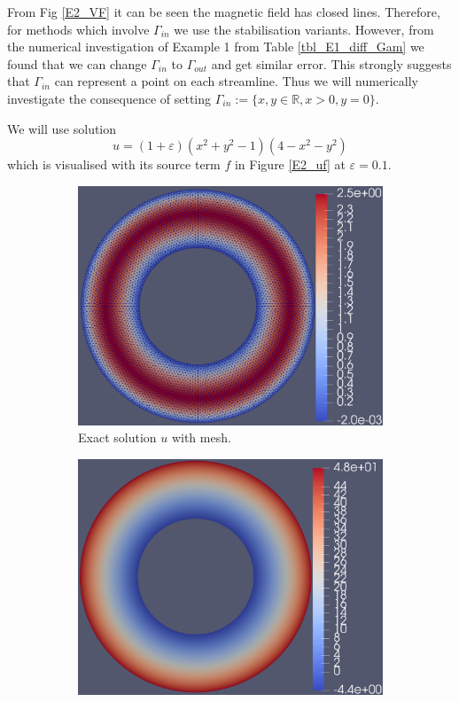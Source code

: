\documentclass[12pt]{ociamthesis}
\begin{document}
From Fig \ref{E2_VF} it can be seen the magnetic field has closed lines. Therefore, for methods which involve $\Gamma_{in}$ we use the stabilisation variants. However, from the numerical investigation of Example 1 from Table \ref{tbl_E1_diff_Gam} we found that we can change $\Gamma_{in}$ to $\Gamma_{out}$ and get similar error. This strongly suggests that $\Gamma_{in}$ can represent a point on each streamline. Thus we will numerically investigate the consequence of setting $\Gamma_{in}:=\{x,y \in \mathbb{R}, x>0, y=0\}$.

We will use solution
\begin{equation}
u = (1+\varepsilon)(x^2 + y^2 -1)(4-x^2-y^2)
\end{equation}
which is visualised with its source term $f$ in Figure \ref{E2_uf} at $\varepsilon = 0.1$.
\begin{figure}[H]
 \begin{subfigure}{0.5\textwidth}
     \includegraphics[width=\textwidth]{Pics/uf/U_E2_eps_1.png}
     \caption{Exact solution $u$ with mesh.}
 \end{subfigure}
   \begin{subfigure}{0.5\textwidth}
     \includegraphics[width=\textwidth]{Pics/uf/F_E2_eps_1.png}

\end{subfigure}
\end{figure}
\end{document}
